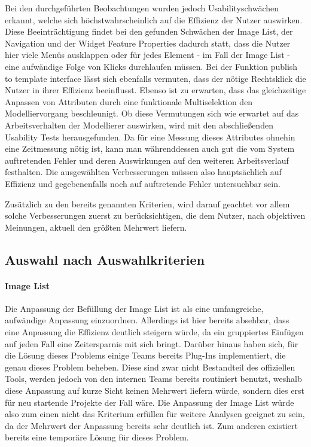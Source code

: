 Bei den durchgeführten Beobachtungen wurden jedoch Usabilityschwächen erkannt, welche sich höchstwahrscheinlich auf die Effizienz der Nutzer auswirken.
Diese Beeinträchtigung findet bei den gefunden Schwächen der Image List, der Navigation und der Widget Feature Properties dadurch statt, dass die Nutzer hier viele Menüs ausklappen oder für jedes Element - im Fall der Image List -  eine aufwändige Folge von Klicks durchlaufen müssen.
Bei der Funktion \glqq publish to template interface\grqq{} lässt sich ebenfalls vermuten, dass der nötige Rechtsklick die Nutzer in ihrer Effizienz beeinflusst.
Ebenso ist zu erwarten, dass das gleichzeitige Anpassen von Attributen durch eine funktionale Multiselektion den Modelliervorgang beschleunigt.
Ob diese Vermutungen sich wie erwartet auf das Arbeitsverhalten der Modellierer auswirken, wird mit den abschließenden Usability Tests herausgefunden.
Da für eine Messung dieses Attributes ohnehin eine Zeitmessung nötig ist, kann man währenddessen auch gut die vom System auftretenden Fehler und deren Auswirkungen auf den weiteren Arbeitsverlauf festhalten.
Die ausgewählten Verbesserungen müssen also hauptsächlich auf Effizienz und gegebenenfalls noch auf auftretende Fehler untersuchbar sein.

Zusätzlich zu den bereits genannten Kriterien, wird darauf geachtet  vor allem solche Verbesserungen zuerst zu berücksichtigen, die dem Nutzer, nach objektiven Meinungen, aktuell den größten Mehrwert liefern.

\subsection{Auswahl nach Auswahlkriterien}

\paragraph{Image List}
Die Anpassung der Befüllung der Image List ist als eine umfangreiche, aufwändige Anpassung einzuordnen.
Allerdings ist hier bereits absehbar, dass eine Anpassung die Effizienz deutlich steigern würde, da ein gruppiertes Einfügen auf jeden Fall eine Zeitersparnis mit sich bringt.
Darüber hinaus haben sich, für die Lösung dieses Problems einige Teams bereits Plug-Ins implementiert, die genau dieses Problem beheben. 
Diese sind zwar nicht Bestandteil des offiziellen Tools, werden jedoch von den internen Teams bereits routiniert benutzt, weshalb diese Anpassung auf kurze Sicht keinen Mehrwert liefern würde, sondern dies erst für neu startende Projekte der Fall wäre.
Die Anpassung der Image List würde also zum einen nicht das Kriterium erfüllen für weitere Analysen geeignet zu sein, da der Mehrwert der Anpassung bereits sehr deutlich ist.
Zum anderen existiert bereits eine temporäre Lösung für dieses Problem.


